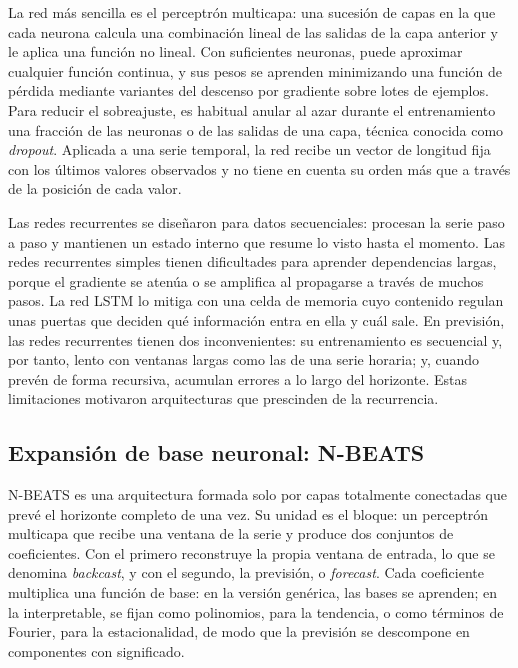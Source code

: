 La red más sencilla es el perceptrón multicapa: una sucesión de capas en la
que cada neurona calcula una combinación lineal de las salidas de la capa
anterior y le aplica una función no lineal. Con suficientes neuronas, puede
aproximar cualquier función continua, y sus pesos se aprenden minimizando
una función de pérdida mediante variantes del descenso por gradiente sobre
lotes de ejemplos. Para reducir el sobreajuste, es habitual anular al azar
durante el entrenamiento una fracción de las neuronas o de las salidas de una
capa, técnica conocida como \textit{dropout}. Aplicada a una serie temporal,
la red recibe un vector de
longitud fija con los últimos valores observados y no tiene en cuenta su
orden más que a través de la posición de cada valor.

Las redes recurrentes se diseñaron para datos secuenciales: procesan la
serie paso a paso y mantienen un estado interno que resume lo visto hasta
el momento. Las redes recurrentes simples tienen dificultades para aprender
dependencias largas, porque el gradiente se atenúa o se amplifica al
propagarse a través de muchos pasos. La red LSTM
\parencite{hochreiter1997long} lo mitiga con una celda de memoria cuyo
contenido regulan unas puertas que deciden qué información entra en ella y
cuál sale. En previsión, las redes recurrentes tienen dos
inconvenientes: su entrenamiento es secuencial y, por tanto, lento con
ventanas largas como las de una serie horaria; y, cuando prevén de forma
recursiva, acumulan errores a lo largo del horizonte. Estas limitaciones
motivaron arquitecturas que prescinden de la recurrencia.

\subsection{Expansión de base neuronal: N-BEATS}\label{sec:nbeats}

N-BEATS \parencite{oreshkin2020nbeats} es una arquitectura formada solo por
capas totalmente conectadas que prevé el horizonte completo de una vez. Su
unidad es el bloque: un perceptrón multicapa que recibe una ventana de la
serie y produce dos conjuntos de coeficientes. Con el primero reconstruye la
propia ventana de entrada, lo que se denomina \textit{backcast}, y con el
segundo, la previsión, o \textit{forecast}. Cada coeficiente multiplica una
función de base: en la versión genérica, las bases se aprenden; en la
interpretable, se fijan como polinomios, para la tendencia, o como términos
de Fourier, para la estacionalidad, de modo que la previsión se descompone en
componentes con significado.

